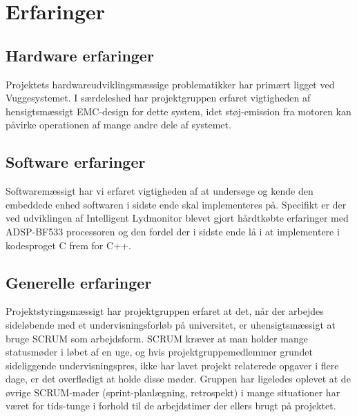 \chapter{Erfaringer}

\section{Hardware erfaringer}
Projektets hardwareudviklingsmæssige problematikker har primært ligget ved Vuggesystemet. I særdeleshed har projektgruppen erfaret vigtigheden af hensigtsmæssigt EMC-design for dette system, idet støj-emission fra motoren kan påvirke operationen af mange andre dele af systemet. 

\section{Software erfaringer}
Softwaremæssigt har vi erfaret vigtigheden af at undersøge og kende den embeddede enhed softwaren i sidste ende skal implementeres på. Specifikt er der ved udviklingen af Intelligent Lydmonitor blevet gjort hårdtkøbte erfaringer med ADSP-BF533 processoren og den fordel der i sidste ende lå i at implementere i kodesproget C frem for C++.

\section{Generelle erfaringer}
Projektstyringsmæssigt har projektgruppen erfaret at det, når der arbejdes sideløbende med et undervisningsforløb på universitet, er uhensigtsmæssigt at bruge SCRUM som arbejdsform. SCRUM kræver at man holder mange statusmøder i løbet af en uge, og hvis projektgruppemedlemmer grundet sideliggende undervisningspres, ikke har lavet projekt relaterede opgaver i flere dage, er det overflødigt at holde disse møder. Gruppen har ligeledes oplevet at de øvrige SCRUM-møder (sprint-planlægning, retrospekt) i mange situationer har været for tids-tunge i forhold til de arbejdstimer der ellers brugt på projektet.